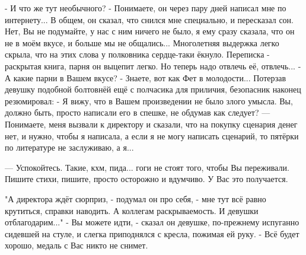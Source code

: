  - И что же тут необычного?
 - Понимаете, он через пару дней написал мне по интернету... В общем, он сказал, что снился мне специально, и пересказал сон. Нет, Вы не подумайте, у нас с ним ничего не было, я ему сразу сказала, что он не в моём вкусе, и больше мы не общались...
Многолетняя выдержка легко скрыла, что на этих слова у полковника сердце-таки ёкнуло. Переписка - раскрытая книга, парня он выцепит легко. Но теперь надо отвлечь её, отвлечь...
 - А какие парни в Вашем вкусе?
 - Знаете, вот как Фет в молодости...
Потерзав девушку подобной болтовнёй ещё с полчасика для приличия, безопасник наконец резюмировал:
 - Я вижу, что в Вашем произведении не было злого умысла. Вы, должно быть, просто написали его в спешке, не обдумав как следует?
--- Понимаете, меня вызвали к директору и сказали, что на покупку сценария денег нет,
 и нужно, чтобы я написала, а если я не могу написать сценарий, то пятёрки по литературе не заслуживаю, а я...

--- Успокойтесь. Такие, кхм, пида... гоги не стоят того, чтобы Вы переживали.
Пишите стихи, пишите, просто осторожно и вдумчиво. У Вас это получается.

"А директора ждёт сюрприз, - подумал он про себя, - мне тут всё равно крутиться, справки наводить. А коллегам раскрываемость. И девушки отблагодарим..."
 - Вы можете идти, - сказал он девушке, по-прежнему испуганно сидевшей на стуле, и слегка приподнялся с кресла, пожимая ей руку. - Всё будет хорошо, медаль с Вас никто не снимет.


